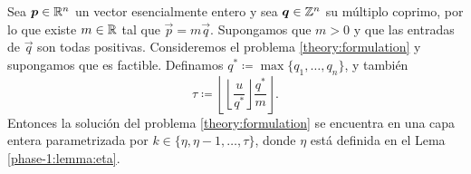 \begin{lemma}
	\label{lemma:tau}
	Sea $\boldsymbol{p} \in \mathbb{R}^n$ un vector esencialmente entero y sea $\boldsymbol{q} \in \mathbb{Z}^n$ su múltiplo
	coprimo, por lo que existe $m \in \mathbb{R}$ tal que $\vec{p} = m\vec{q}$. Supongamos que $m > 0$ y que
	las entradas de $\vec{q}$ son todas positivas. Consideremos el problema
	\eqref{theory:formulation} y supongamos que es factible. Definamos $q^* \coloneq \max\lbrace
	q_1, \ldots, q_n \rbrace$, y también
	\begin{equation}
		\label{eq:tau}
		\tau \coloneq \left\lfloor \left\lfloor \frac{u}{q^*} \right\rfloor
			\frac{q^*}{m} \right\rfloor.
	\end{equation}
	Entonces la solución del problema \eqref{theory:formulation} se encuentra en una capa entera
	parametrizada por $k \in \lbrace \eta, \eta - 1, \ldots, \tau \rbrace$, donde $\eta$ está
	definida en el Lema \ref{phase-1:lemma:eta}.
\end{lemma}
